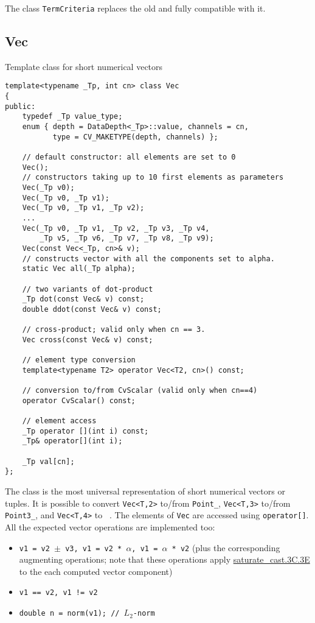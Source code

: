 The class \texttt{TermCriteria} replaces the old  and fully compatible with it.


\subsection{Vec}\label{Vec}
Template class for short numerical vectors

\begin{lstlisting}
template<typename _Tp, int cn> class Vec
{
public:
    typedef _Tp value_type;
    enum { depth = DataDepth<_Tp>::value, channels = cn,
           type = CV_MAKETYPE(depth, channels) };
    
    // default constructor: all elements are set to 0
    Vec();
    // constructors taking up to 10 first elements as parameters
    Vec(_Tp v0);
    Vec(_Tp v0, _Tp v1);
    Vec(_Tp v0, _Tp v1, _Tp v2);
    ...
    Vec(_Tp v0, _Tp v1, _Tp v2, _Tp v3, _Tp v4,
        _Tp v5, _Tp v6, _Tp v7, _Tp v8, _Tp v9);
    Vec(const Vec<_Tp, cn>& v);
    // constructs vector with all the components set to alpha.
    static Vec all(_Tp alpha);
    
    // two variants of dot-product
    _Tp dot(const Vec& v) const;
    double ddot(const Vec& v) const;
    
    // cross-product; valid only when cn == 3.
    Vec cross(const Vec& v) const;
    
    // element type conversion
    template<typename T2> operator Vec<T2, cn>() const;
    
    // conversion to/from CvScalar (valid only when cn==4)
    operator CvScalar() const;
    
    // element access
    _Tp operator [](int i) const;
    _Tp& operator[](int i);

    _Tp val[cn];
};
\end{lstlisting}

The class is the most universal representation of short numerical vectors or tuples. It is possible to convert \texttt{Vec<T,2>} to/from \texttt{Point\_}, \texttt{Vec<T,3>} to/from \texttt{Point3\_}, and \texttt{Vec<T,4>} to ~. The elements of \texttt{Vec} are accessed using \texttt{operator[]}. All the expected vector operations are implemented too:

\begin{itemize}
    \item \texttt{v1 = v2 $\pm$ v3, v1 = v2 * $\alpha$, v1 = $\alpha$ * v2} (plus the corresponding augmenting operations; note that these operations apply \hyperref[saturatecast]{saturate\_cast.3C.3E} to the each computed vector component)
    \item \texttt{v1 == v2, v1 != v2}
    \item \texttt{double n = norm(v1); // $L_2$-norm}
\end{itemize}

